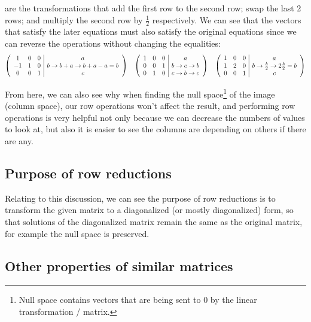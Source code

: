 \documentclass[11pt, cyan, night, 1in]{LatexTemplate/hw}
\begin{document}
are the transformations that add the first row to the second row; swap the last 2 rows; and multiply the second row by $\frac12$ respectively. We can see that the vectors that satisfy the later equations must also satisfy the original equations since we can reverse the operations without changing the equalities:\[
    \left(\begin{array}{ccc|c}
        1 & 0 & 0  & a\\
        -1 & 1 & 0  & b \rightarrow b + a \rightarrow b + a - a = b\\
        0 & 0 & 1 & c
    \end{array}\right) \quad \left(\begin{array}{ccc|c}
        1 & 0 & 0  & a\\
        0 & 0 & 1  & b \rightarrow c \rightarrow b\\
        0 & 1 & 0 & c \rightarrow b \rightarrow c
    \end{array}\right) \quad \left(\begin{array}{ccc|c}
        1 & 0 & 0  & a\\
        1 & 2 & 0  & b \rightarrow \frac{b}{2} \rightarrow 2\frac{b}{2} = b\\
        0 & 0 & 1 & c
    \end{array}\right) 
    \]

From here, we can also see why when finding the null space\footnote{Null space contains vectors that are being sent to 0 by the linear transformation / matrix.} of the image (column space), our row operations won't affect the result, and performing row operations is very helpful not only because we can decrease the numbers of values to look at, but also it is easier to see  the columns are depending on others if there are any.

\subsection{Purpose of row reductions}

Relating to this discussion, we can see the purpose of row reductions is to transform the given matrix to a diagonalized (or mostly diagonalized) form, so that  solutions of the diagonalized matrix remain the same as the original matrix, for example the null space is preserved. 

\subsection{Other properties of similar matrices}
\end{document}
